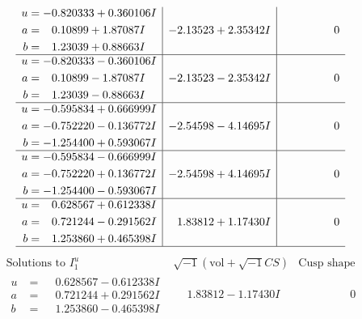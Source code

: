 \documentclass[1p]{elsarticle_modified}
\theoremstyle{definition}
\newcommand{\I}{\sqrt{-1}}
\begin{document}
$$\begin{array}{c|c|c}
\begin{aligned}
u &= -0.820333 + 0.360106 I \\
a &= \phantom{-}0.10899 + 1.87087 I \\
b &= \phantom{-}1.23039 + 0.88663 I\end{aligned}
 & -2.13523 + 2.35342 I & \phantom{-0.000000 } 0 \\ \hline\begin{aligned}
u &= -0.820333 - 0.360106 I \\
a &= \phantom{-}0.10899 - 1.87087 I \\
b &= \phantom{-}1.23039 - 0.88663 I\end{aligned}
 & -2.13523 - 2.35342 I & \phantom{-0.000000 } 0 \\ \hline\begin{aligned}
u &= -0.595834 + 0.666999 I \\
a &= -0.752220 - 0.136772 I \\
b &= -1.254400 + 0.593067 I\end{aligned}
 & -2.54598 - 4.14695 I & \phantom{-0.000000 } 0 \\ \hline\begin{aligned}
u &= -0.595834 - 0.666999 I \\
a &= -0.752220 + 0.136772 I \\
b &= -1.254400 - 0.593067 I\end{aligned}
 & -2.54598 + 4.14695 I & \phantom{-0.000000 } 0 \\ \hline\begin{aligned}
u &= \phantom{-}0.628567 + 0.612338 I \\
a &= \phantom{-}0.721244 - 0.291562 I \\
b &= \phantom{-}1.253860 + 0.465398 I\end{aligned}
 & \phantom{-}1.83812 + 1.17430 I & \phantom{-0.000000 } 0\\
 \hline 
 \end{array}$$\newpage$$\begin{array}{c|c|c}  
\text{Solutions to }I^u_{1}& \I (\text{vol} + \sqrt{-1}CS) & \text{Cusp shape}\\
 \hline 
\begin{aligned}
u &= \phantom{-}0.628567 - 0.612338 I \\
a &= \phantom{-}0.721244 + 0.291562 I \\
b &= \phantom{-}1.253860 - 0.465398 I\end{aligned}
 & \phantom{-}1.83812 - 1.17430 I & \phantom{-0.000000 } 0 \\ \hline\begin{aligned}

\end{aligned}
\end{array}$$
\end{document}
